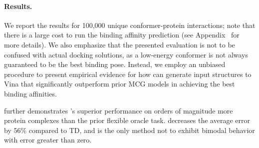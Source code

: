 \paragraph{Results.} We report the results for 100,000 unique conformer-protein interactions; note that there is a large cost to run the binding affinity prediction (see Appendix~ for more details).
We also emphasize that the presented evaluation is not to be confused with actual docking solutions, as a low-energy conformer is not always guaranteed to be the best binding pose. Instead, we employ an unbiased procedure to present empirical evidence for how \model can generate input structures to Vina that significantly outperform prior MCG models in achieving the best binding affinities.

 further demonstrates \modelns's superior performance on orders of magnitude more protein complexes than the prior flexible oracle task. 
\model decreases the average error by 56\% compared to TD, and is the only method not to exhibit bimodal behavior with error greater than zero. 
